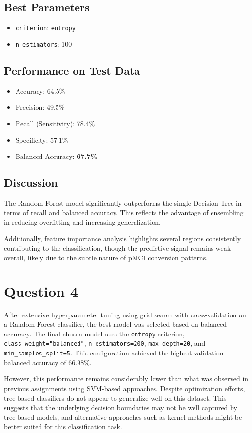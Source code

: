 \documentclass[12pt]{article}
\begin{document}
\subsection*{Best Parameters}
\begin{itemize}
    \item \texttt{criterion}: \texttt{entropy}
    \item \texttt{n\_estimators}: 100
\end{itemize}

\subsection*{Performance on Test Data}
\begin{itemize}
    \item Accuracy: 64.5\%
    \item Precision: 49.5\%
    \item Recall (Sensitivity): 78.4\%
    \item Specificity: 57.1\%
    \item Balanced Accuracy: \textbf{67.7\%}
\end{itemize}

\subsection*{Discussion}
The Random Forest model significantly outperforms the single Decision Tree in terms of recall and balanced accuracy. This reflects the advantage of ensembling in reducing overfitting and increasing generalization.

Additionally, feature importance analysis highlights several regions consistently contributing to the classification, though the predictive signal remains weak overall, likely due to the subtle nature of pMCI conversion patterns.

\section{Question 4}

After extensive hyperparameter tuning using grid search with cross-validation on a Random Forest classifier, the best model was selected based on balanced accuracy. The final chosen model uses the \texttt{entropy} criterion, \texttt{class\_weight="balanced"}, \texttt{n\_estimators=200}, \texttt{max\_depth=20}, and \texttt{min\_samples\_split=5}. This configuration achieved the highest validation balanced accuracy of 66.98\%.

However, this performance remains considerably lower than what was observed in previous assignments using SVM-based approaches. Despite optimization efforts, tree-based classifiers do not appear to generalize well on this dataset. This suggests that the underlying decision boundaries may not be well captured by tree-based models, and alternative approaches such as kernel methods might be better suited for this classification task.
\end{document}
